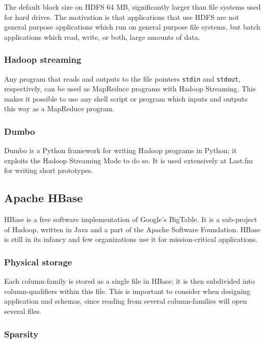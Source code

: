 The default block size on HDFS 64 MB, significantly larger than
file systems used for hard drives. The motivation is that applications
that use HDFS are not general purpose applications which run on general
purpose file systems, but batch applications which read, write, or both,
large amounts of data.


\subsubsection{Hadoop streaming}

Any program that reads and outputs to the file pointers \texttt{stdin} and
\texttt{stdout}, respectively, can be used as MapReduce programs with
Hadoop Streaming. This makes it possible to use any shell script or
program which inputs and outputs this way as a MapReduce program.


\subsubsection{Dumbo}

Dumbo is a Python framework for writing Hadoop programs in Python; it exploits
the Hadoop Streaming Mode to do so. It is used extensively at Last.fm for
writing short prototypes. \cite{dumbo}


\subsection{Apache HBase}

HBase is a free software implementation of Google's BigTable. \cite{bigtable} It
is a sub-project of Hadoop, written in Java and a part of the Apache Software
Foundation. HBase is still in its infancy and few organizations use it for
mission-critical applications. \cite{hbase}


\subsubsection{Physical storage}

Each column-family is stored as a single file in HBase; it is then subdivided
into column-qualifiers within this file. This is important to consider when
designing application and schemas, since reading from several column-families
will open several files.


\subsubsection{Sparsity}

